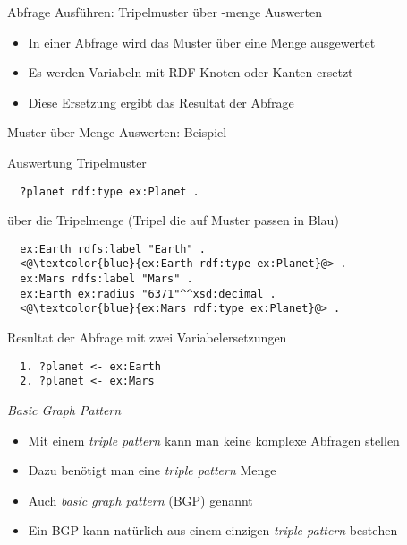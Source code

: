 \documentclass{beamer}
\begin{document}
\begin{frame}{Abfrage Ausführen: Tripelmuster über -menge Auswerten}
	
	\begin{itemize}
		\item In einer Abfrage wird das Muster über eine Menge ausgewertet
		\item Es werden Variabeln mit RDF Knoten oder Kanten ersetzt
		\item Diese Ersetzung ergibt das Resultat der Abfrage
	\end{itemize}
	
\end{frame}

\begin{frame}[fragile]{Muster über Menge Auswerten: Beispiel}
	
	Auswertung Tripelmuster
	\vspace{0.1cm}\small
	\begin{lstlisting}		
  ?planet rdf:type ex:Planet .
    \end{lstlisting}
   	\vspace{0.3cm}\normalsize
    über die Tripelmenge (Tripel die auf Muster passen in Blau)
   	\vspace{0.1cm}\small
	\begin{lstlisting}
  ex:Earth rdfs:label "Earth" .
  <@\textcolor{blue}{ex:Earth rdf:type ex:Planet}@> .
  ex:Mars rdfs:label "Mars" .
  ex:Earth ex:radius "6371"^^xsd:decimal .
  <@\textcolor{blue}{ex:Mars rdf:type ex:Planet}@> .
    \end{lstlisting}
   	\vspace{0.3cm}\normalsize
    Resultat der Abfrage mit zwei Variabelersetzungen
   	\vspace{0.1cm}\small
	\begin{lstlisting}
  1. ?planet <- ex:Earth
  2. ?planet <- ex:Mars
	\end{lstlisting}
\end{frame}

\begin{frame}{\emph{Basic Graph Pattern}}
	
	\begin{itemize}
		\item Mit einem \emph{triple pattern} kann man keine komplexe Abfragen stellen
		\item Dazu benötigt man eine \emph{triple pattern} Menge
		\item Auch \emph{basic graph pattern} (BGP) genannt
		\item Ein BGP kann natürlich aus einem einzigen \emph{triple pattern} bestehen
	\end{itemize}
	
\end{frame}
\end{document}
